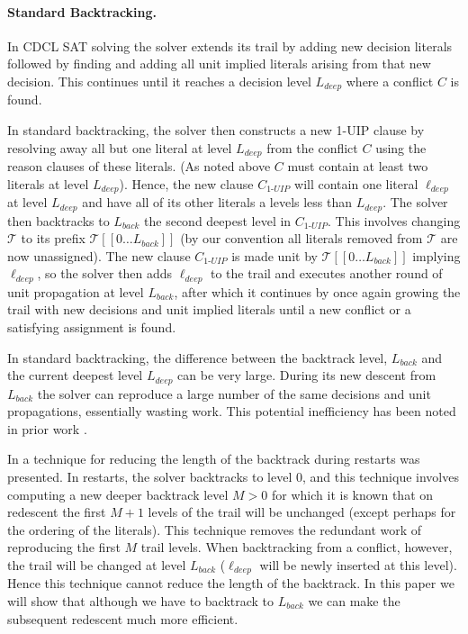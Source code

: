 \documentclass[runningheads]{llncs}
\newcommand{\sat}{SAT\xspace}
\newcommand{\trail}{\ensuremath{\mathcal{T}}}
\newcommand{\range}[2]{#1\ldots#2}
\newcommand{\uipcls}{C_{\textit{1-UIP}}}
\newcommand{\deepestLvl}{L_{\textit{deep}}}
\newcommand{\deepestLit}{\ell_{\textit{deep}}}
\newcommand{\btL}{L_{\textit{back}}}
\begin{document}
\paragraph{Standard Backtracking.}
In CDCL \sat solving the solver extends its trail by adding new
decision literals followed by finding and adding all unit implied
literals arising from that new decision. This continues until it
reaches a decision level $\deepestLvl$ where a conflict $C$ is found.

In standard backtracking, the solver then constructs a new 1-UIP
clause by resolving away all but one literal at level $\deepestLvl$
from the conflict $C$ using the reason clauses of these literals. (As
noted above $C$ must contain at least two literals at level
$\deepestLvl$). Hence, the new clause $\uipcls$ will contain one
literal $\deepestLit$ at level $\deepestLvl$ and have all of its other
literals a levels less than $\deepestLvl$. The solver then backtracks
to $\btL$ the second deepest level in $\uipcls$. This involves
changing $\trail$ to its prefix $\trail[[\range{0}{\btL}]]$ (by our
convention all literals removed from $\trail$ are now unassigned). The
new clause $\uipcls$ is made unit by $\trail[[\range{0}{\btL}]]$
implying $\deepestLit$, so the solver then adds $\deepestLit$ to the
trail and executes another round of unit propagation at level $\btL$,
after which it continues by once again growing the trail with new
decisions and unit implied literals until a new conflict or a
satisfying assignment is found.

In standard backtracking, the difference between the backtrack level,
$\btL$ and the current deepest level $\deepestLvl$ can be very
large. During its new descent from $\btL$ the solver can reproduce a
large number of the same decisions and unit propagations, essentially
wasting work. This potential inefficiency has been noted in prior work
\cite{DBLP:journals/jsat/TakRH11,DBLP:conf/lpar/JiangZ13,DBLP:conf/sat/NadelR18,DBLP:conf/sat/MohleB19}.

In \cite{DBLP:journals/jsat/TakRH11} a technique for reducing the
length of the backtrack during restarts was presented. In restarts,
the solver backtracks to level $0$, and this technique involves
computing a new deeper backtrack level $M> 0$ for which it is known
that on redescent the first $M+1$ levels of the trail will be
unchanged (except perhaps for the ordering of the literals). This
technique removes the redundant work of reproducing the first $M$
trail levels. When backtracking from a conflict, however, the trail
will be changed at level $\btL$ ($\deepestLit$ will be newly inserted
at this level). Hence this technique cannot reduce the length of the
backtrack. In this paper we will show that although we have to
backtrack to $\btL$ we can make the subsequent redescent much more
efficient.
\end{document}
